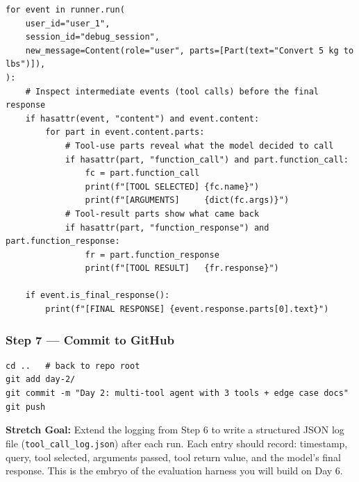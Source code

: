 \documentclass[12pt, a4paper]{article}
\begin{document}
\begin{practicalbox}
\begin{lstlisting}[style=pythonstyle, caption={Extracting tool-call reasoning from the event stream}]
for event in runner.run(
    user_id="user_1",
    session_id="debug_session",
    new_message=Content(role="user", parts=[Part(text="Convert 5 kg to lbs")]),
):
    # Inspect intermediate events (tool calls) before the final response
    if hasattr(event, "content") and event.content:
        for part in event.content.parts:
            # Tool-use parts reveal what the model decided to call
            if hasattr(part, "function_call") and part.function_call:
                fc = part.function_call
                print(f"[TOOL SELECTED] {fc.name}")
                print(f"[ARGUMENTS]     {dict(fc.args)}")
            # Tool-result parts show what came back
            if hasattr(part, "function_response") and part.function_response:
                fr = part.function_response
                print(f"[TOOL RESULT]   {fr.response}")

    if event.is_final_response():
        print(f"[FINAL RESPONSE] {event.response.parts[0].text}")
\end{lstlisting}

\subsubsection*{Step 7 --- Commit to GitHub}

\begin{lstlisting}[style=bashstyle]
cd ..   # back to repo root
git add day-2/
git commit -m "Day 2: multi-tool agent with 3 tools + edge case docs"
git push
\end{lstlisting}

\medskip

\begin{stretchbox}
\textbf{Stretch Goal:} Extend the logging from Step 6 to write a structured JSON log file (\texttt{tool\_call\_log.json}) after each run. Each entry should record: timestamp, query, tool selected, arguments passed, tool return value, and the model's final response. This is the embryo of the evaluation harness you will build on Day 6.
\end{stretchbox}

\end{practicalbox}

\vspace{1.5em}
\end{document}
